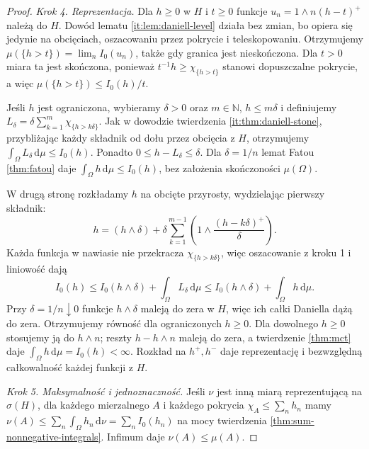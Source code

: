 \begin{proof}
\emph{Krok 4. Reprezentacja.}
Dla $h\ge0$ w $H$ i $t\ge0$ funkcje
$u_n=1\wedge n(h-t)^+$ należą do $H$.
Dowód lematu \ref{it:lem:daniell-level} działa bez
zmian, bo opiera się jedynie na obcięciach,
oszacowaniu przez pokrycie i teleskopowaniu.
Otrzymujemy $\mu(\{h>t\})=\lim_n I_0(u_n)$,
także gdy granica jest nieskończona.
Dla $t>0$ miara ta jest skończona, ponieważ
$t^{-1}h\ge\chi_{\{h>t\}}$ stanowi dopuszczalne
pokrycie, a więc $\mu(\{h>t\})\le I_0(h)/t$.

Jeśli $h$ jest ograniczona, wybieramy $\delta>0$
oraz $m\in\mathbb{N}$, $h\le m\delta$ i definiujemy
$L_\delta=\delta\sum_{k=1}^m\chi_{\{h>k\delta\}}$.
Jak w dowodzie twierdzenia
\ref{it:thm:daniell-stone}, przybliżając każdy
składnik od dołu przez obcięcia z $H$, otrzymujemy
$\int_\Omega L_\delta\,\mathrm d\mu\le I_0(h)$.
Ponadto $0\le h-L_\delta\le\delta$.
Dla $\delta=1/n$ lemat Fatou
\ref{thm:fatou} daje $\int_\Omega h\,\mathrm d\mu
\le I_0(h)$, bez założenia skończoności $\mu(\Omega)$.

W drugą stronę rozkładamy $h$ na obcięte przyrosty,
wydzielając pierwszy składnik:
\[
 h=(h\wedge\delta)+
 \delta\sum_{k=1}^{m-1}
 \left(1\wedge\frac{(h-k\delta)^+}{\delta}\right).
\]
Każda funkcja w nawiasie nie przekracza
$\chi_{\{h>k\delta\}}$, więc oszacowanie z kroku 1
i liniowość dają
\[
 I_0(h)\le I_0(h\wedge\delta)+
 \int_\Omega L_\delta\,\mathrm d\mu
 \le I_0(h\wedge\delta)+\int_\Omega h\,\mathrm d\mu.
\]
Przy $\delta=1/n\downarrow0$ funkcje $h\wedge\delta$
maleją do zera w $H$, więc ich całki Daniella
dążą do zera. Otrzymujemy równość dla ograniczonych
$h\ge0$. Dla dowolnego $h\ge0$ stosujemy ją do
$h\wedge n$; reszty $h-h\wedge n$ maleją do zera,
a twierdzenie \ref{thm:mct} daje
$\int_\Omega h\,\mathrm d\mu=I_0(h)<\infty$.
Rozkład na $h^+,h^-$ daje reprezentację i bezwzględną
całkowalność każdej funkcji z $H$.

\emph{Krok 5. Maksymalność i jednoznaczność.}
Jeśli $\nu$ jest inną miarą reprezentującą na
$\sigma(H)$, dla każdego mierzalnego $A$ i każdego
pokrycia $\chi_A\le\sum_n h_n$ mamy
$\nu(A)\le\sum_n\int_\Omega h_n\,\mathrm d\nu
=\sum_n I_0(h_n)$ na mocy twierdzenia
\ref{thm:sum-nonnegative-integrals}.
Infimum daje $\nu(A)\le\mu(A)$.


\end{proof}
